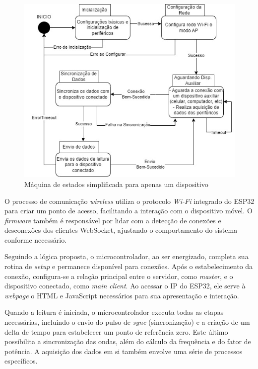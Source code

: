 \begin{figure}[htb!]
    \caption{Máquina de estados simplificada para apenas um dispositivo}
    \vspace*{5mm}
    \label{fig:maq-estado-simp}
    \includegraphics[width=1.0\textwidth]{figuras/Maquina-Estados-Simplificada.jpg}
    \fonte{}
\end{figure}

O processo de comunicação \textit{wireless} utiliza o protocolo \textit{Wi-Fi} integrado do ESP32 para criar um ponto de acesso, facilitando a interação com o dispositivo móvel. O \textit{firmware} também é responsável por lidar com a detecção de conexões e desconexões dos clientes WebSocket, ajustando o comportamento do sistema conforme necessário.

Seguindo a lógica proposta, o microcontrolador, ao ser energizado, completa sua rotina de \textit{setup} e permanece disponível para conexões. Após o estabelecimento da conexão, configura-se a relação principal entre o servidor, como \textit{master}, e o dispositivo conectado, como \textit{main client}. Ao acessar o IP do ESP32, ele serve à \textit{webpage} o HTML e JavaScript necessários para sua apresentação e interação.

Quando a leitura é iniciada, o microcontrolador executa todas as etapas necessárias, incluindo o envio do pulso de \textit{sync} (sincronização) e a criação de um delta de tempo para estabelecer um ponto de referência zero. Este último possibilita a sincronização das ondas, além do cálculo da frequência e do fator de potência. A aquisição dos dados em si também envolve uma série de processos específicos.

